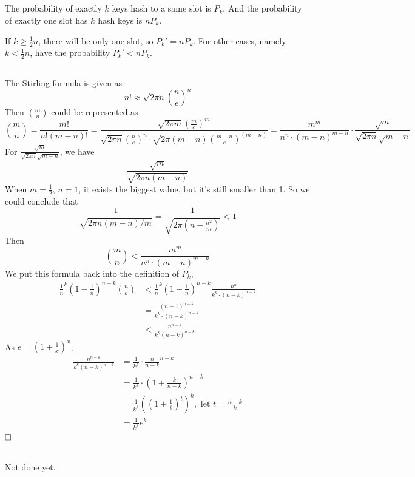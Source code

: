 \documentclass{article}
\newcommand{\qedhere}{$\hfill\ensuremath{\square}$}
\begin{document}
\subsection{}
The probability of exactly $k$ keys hash to a same slot is $P_k$. And the probability of exactly one slot has $k$ hash keys is $nP_k$. 
\par If $k \geq \frac{1}{2}n$, there will be only one slot, so $P_k' = nP_k$. For other cases, namely $k < \frac{1}{2}n$, have the probability $P_k'< nP_k$.
\subsection{}
The Stirling formula is given as 
\[
	n! \approx \sqrt{2 \pi n} \left(\frac{n}{e}\right)^n
\] 
Then $ \binom{m}{n}$ could be represented as
\[
	\binom{m}{n} = \frac{m!}{n!(m-n)!} = \frac{\sqrt{2 \pi m} \left(\frac{m}{e}\right)^m}{\sqrt{2 \pi n} \left(\frac{n}{e}\right)^n \cdot \sqrt{2 \pi (m-n)} \left(\frac{m-n}{e}\right)^{(m-n)}} = \frac{m^m}{n^n\cdot (m-n)^{m-n}}\cdot \frac{\sqrt{m}}{\sqrt{2 \pi n} \sqrt{m-n}}
\]
For $\frac{\sqrt{m}}{\sqrt{2 \pi n} \sqrt{m-n}}$, we have 
\[
	\frac{\sqrt{m}}{\sqrt{2 \pi n(m-n)}}
\]	
When $m= \frac{1}{2}$, $n=1$, it exists the biggest value, but it's still smaller than 1. So we could conclude that 
\[
	\frac{1}{\sqrt{2 \pi n(m-n)/m}} = \frac{1}{\sqrt{2 \pi (n- \frac{n^2}{m})}} <1
\]
Then \[
	\binom{m}{n} < \frac{m^m}{n^n\cdot (m-n)^{m-n}}
\]
We put this formula back into the definition of $P_k$, 
\[
\begin{aligned}
	\frac{1}{n}^k \left(1- \frac{1}{n} \right)^{n-k} \binom{n}{k} &< \frac{1}{n}^k \left(1- \frac{1}{n} \right)^{n-k} \frac{n^n}{k^k\cdot (n-k)^{n-k}}\\
	& = \frac{(n-1)^{n-k}}{k^k\cdot (n-k)^{n-k}}\\
	&< \frac{n^{n-k}}{k^k(n-k)^{n-k}}
\end{aligned}
\]
As $e = (1+\frac{1}{x})^x$, 
\[
	\begin{aligned}
	\frac{n^{n-k}}{k^k(n-k)^{n-k}} &= \frac{1}{k^k} \cdot \frac{n}{n-k}^{n-k} \\
	&=\frac{1}{k^k} \cdot \left(1+\frac{k}{n-k} \right)^{n-k} \\
	&= \frac{1}{k^k} ((1+\frac{1}{t})^t)^k, \text{\ \ \ let $t = \frac{n-k}{k}$} \\
	&= \frac{1}{k^k} e^k
	\end{aligned}
\]
\qedhere
\subsection{}
Not done yet.
\end{document}
